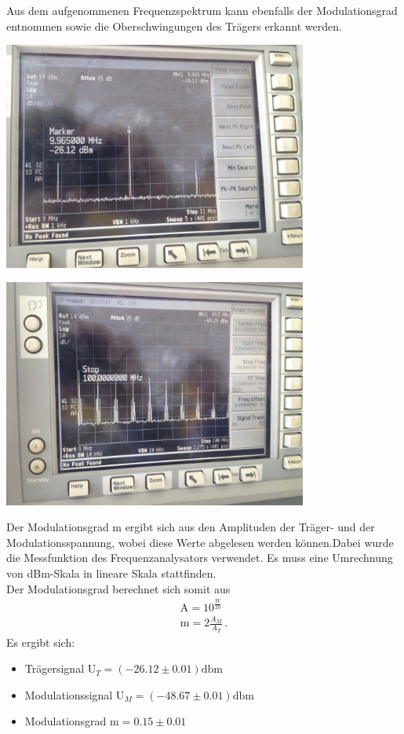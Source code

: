 \documentclass[]{scrartcl}
\begin{document}
Aus dem aufgenommenen Frequenzspektrum kann ebenfalls der Modulationsgrad entnommen sowie die Oberschwingungen des Trägers erkannt werden. \\
\begin{center}
	\includegraphics[width=10cm]{images/freqampmoddio.jpg}
	\label{fig:freqdio}
\end{center}
\begin{center}
	\includegraphics[width=10cm]{images/oberwellen.jpg}
	\label{fig:oberwellen}
\end{center}
Der Modulationsgrad m ergibt sich aus den Amplituden der Träger- und der Modulationsspannung, wobei diese Werte abgelesen werden können.Dabei wurde die Messfunktion des Frequenzanalysators verwendet. Es muss eine Umrechnung von dBm-Skala in lineare Skala stattfinden. \\
Der Modulationsgrad berechnet sich somit aus
\begin{align}
\text{A}=10^{\frac{W}{20}} \\
\text{m}=2\frac{A_M}{A_T}\,.
\end{align}
Es ergibt sich:
\begin{itemize}
	\item Trägersignal U$_T=(-26.12\pm 0.01) \text{dbm}$
	\item Modulationssignal U$_M=(-48.67\pm 0.01) \text{dbm}$
	\item Modulationsgrad m$=0.15\pm 0.01$
\end{itemize}
\end{document}
